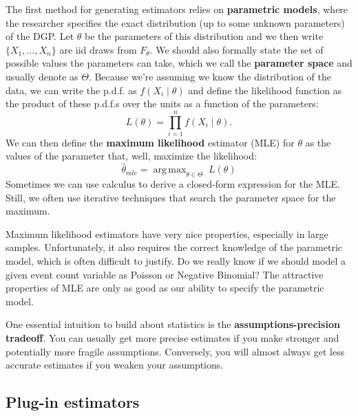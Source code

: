 \documentclass[
  letterpaper,
  DIV=11,
  numbers=noendperiod]{scrreprt}
\DeclareMathOperator*{\argmax}{arg\,max}
\theoremstyle{definition}
\theoremstyle{plain}
\theoremstyle{definition}
\theoremstyle{remark}
\begin{document}
The first method for generating estimators relies on \textbf{parametric
models}, where the researcher specifies the exact distribution (up to
some unknown parameters) of the DGP. Let \(\theta\) be the parameters of
this distribution and we then write \(\{X_1, \ldots, X_n\}\) are iid
draws from \(F_{\theta}\). We should also formally state the set of
possible values the parameters can take, which we call the
\textbf{parameter space} and usually denote as \(\Theta\). Because we're
assuming we know the distribution of the data, we can write the p.d.f.
as \(f(X_i \mid \theta)\) and define the likelihood function as the
product of these p.d.f.s over the units as a function of the parameters:
\[
L(\theta) = \prod_{i=1}^n f(X_i \mid \theta).
\] We can then define the \textbf{maximum likelihood} estimator (MLE)
for \(\theta\) as the values of the parameter that, well, maximize the
likelihood: \[
\widehat{\theta}_{mle} = \argmax_{\theta \in \Theta} \; L(\theta)
\] Sometimes we can use calculus to derive a closed-form expression for
the MLE. Still, we often use iterative techniques that search the
parameter space for the maximum.

Maximum likelihood estimators have very nice properties, especially in
large samples. Unfortunately, it also requires the correct knowledge of
the parametric model, which is often difficult to justify. Do we really
know if we should model a given event count variable as Poisson or
Negative Binomial? The attractive properties of MLE are only as good as
our ability to specify the parametric model.

\begin{tcolorbox}[enhanced jigsaw, title=\textcolor{quarto-callout-note-color}{\faInfo}\hspace{0.5em}{No free lunch}, breakable, titlerule=0mm, opacityback=0, rightrule=.15mm, bottomrule=.15mm, colframe=quarto-callout-note-color-frame, coltitle=black, colbacktitle=quarto-callout-note-color!10!white, bottomtitle=1mm, toptitle=1mm, colback=white, arc=.35mm, opacitybacktitle=0.6, toprule=.15mm, leftrule=.75mm, left=2mm]

One essential intuition to build about statistics is the
\textbf{assumptions-precision tradeoff}. You can usually get more
precise estimates if you make stronger and potentially more fragile
assumptions. Conversely, you will almost always get less accurate
estimates if you weaken your assumptions.

\end{tcolorbox}

\hypertarget{plug-in-estimators}{%
\subsection{Plug-in estimators}\label{plug-in-estimators}}
\end{document}
